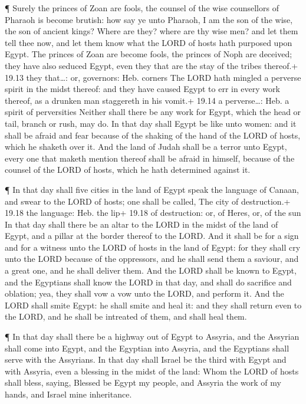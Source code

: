  ¶ Surely the princes of Zoan are fools, the counsel of the
wise counsellors of Pharaoh is become brutish: how say ye unto Pharaoh,
I am the son of the wise, the son of ancient kings?  Where
are they? where are thy wise men? and let them tell thee now, and let
them know what the LORD of hosts hath purposed upon Egypt. 
The princes of Zoan are become fools, the princes of Noph are deceived;
they have also seduced Egypt, even they that are the stay of the tribes
thereof.+ 19.13 they that\ldots: or, governors: Heb. corners
 The LORD hath mingled a perverse spirit in the midst
thereof: and they have caused Egypt to err in every work thereof, as a
drunken man staggereth in his vomit.+ 19.14 a perverse\ldots: Heb. a
spirit of perversities  Neither shall there be any work for
Egypt, which the head or tail, branch or rush, may do.  In
that day shall Egypt be like unto women: and it shall be afraid and fear
because of the shaking of the hand of the LORD of hosts, which he
shaketh over it.  And the land of Judah shall be a terror
unto Egypt, every one that maketh mention thereof shall be afraid in
himself, because of the counsel of the LORD of hosts, which he hath
determined against it.

 ¶ In that day shall five cities in the land of Egypt speak
the language of Canaan, and swear to the LORD of hosts; one shall be
called, The city of destruction.+ 19.18 the language: Heb. the lip+
19.18 of destruction: or, of Heres, or, of the sun  In that
day shall there be an altar to the LORD in the midst of the land of
Egypt, and a pillar at the border thereof to the LORD.  And
it shall be for a sign and for a witness unto the LORD of hosts in the
land of Egypt: for they shall cry unto the LORD because of the
oppressors, and he shall send them a saviour, and a great one, and he
shall deliver them.  And the LORD shall be known to Egypt,
and the Egyptians shall know the LORD in that day, and shall do
sacrifice and oblation; yea, they shall vow a vow unto the LORD, and
perform it.  And the LORD shall smite Egypt: he shall smite
and heal it: and they shall return even to the LORD, and he shall be
intreated of them, and shall heal them.

 ¶ In that day shall there be a highway out of Egypt to
Assyria, and the Assyrian shall come into Egypt, and the Egyptian into
Assyria, and the Egyptians shall serve with the Assyrians. 
In that day shall Israel be the third with Egypt and with Assyria, even
a blessing in the midst of the land:  Whom the LORD of
hosts shall bless, saying, Blessed be Egypt my people, and Assyria the
work of my hands, and Israel mine inheritance.

